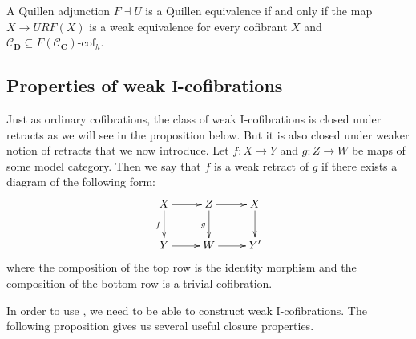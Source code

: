 \documentclass{tac}
\theoremstyle{definition}
\newcommand{\cof}{\mathcal{C}}
\newcommand{\cat}[1]{\mathbf{#1}}
\newcommand{\C}{\cat{C}}
\newcommand{\D}{\cat{D}}
\newcommand{\I}{\mathrm{I}}
\newcommand{\class}[2]{#1\text{-}\mathrm{#2}}
\newcommand{\Icof}[1][\I]{\class{#1}{cof}}
\begin{document}
\begin{cor}
A Quillen adjunction $F \dashv U$ is a Quillen equivalence if and only if the map $X \to URF(X)$ is a weak equivalence for every cofibrant $X$ and $\cof_\D \subseteq \Icof[F(\cof_\C)]_h$.
\end{cor}

\subsection{Properties of weak $\I$-cofibrations}

Just as ordinary cofibrations, the class of weak $\I$-cofibrations is closed under retracts as we will see in the proposition below.
But it is also closed under weaker notion of retracts that we now introduce.
Let $f : X \to Y$ and $g : Z \to W$ be maps of some model category.
Then we say that $f$ is a weak retract of $g$ if there exists a diagram of the following form:
\[ \xymatrix{ X \ar[r] \ar[d]_f & Z \ar[r] \ar[d]_g & X \ar[d] \\
              Y \ar[r]          & W \ar[r]          & Y'
            } \]
where the composition of the top row is the identity morphism and the composition of the bottom row is a trivial cofibration.

In order to use , we need to be able to construct weak $\I$-cofibrations.
The following proposition gives us several useful closure properties.
\end{document}
